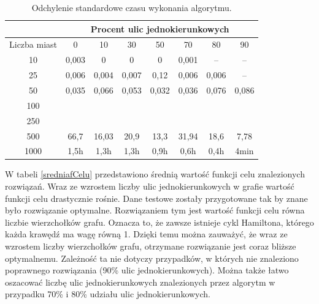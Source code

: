 \documentclass[11pt,a4paper,twoside]{article}
\begin{document}
\bgroup
\def\arraystretch{1.2}
\begin{table}[ht]
\centering
\begin{tabular}{|c|c|c|c|c|c|c|c|}
\hline
 & \multicolumn{7}{c|}{Procent ulic jednokierunkowych}\\\hline
Liczba miast & 0 & 10 & 30 & 50 & 70& 80& 90\\  \hline
10& 0,003& 0& 0& 0& 0,001& --& --\\ \hline
25& 0,006& 0,004& 0,007& 0,12& 0,006& 0,006& --\\ \hline
50& 0,035& 0,066& 0,053& 0,032& 0,036& 0,076& 0,086\\ \hline
100& & & & & & & \\ \hline
250& & & & & & & \\ \hline
500& 66,7& 16,03& 20,9& 13,3& 31,94& 18,6& 7,78\\ \hline
1000& 1,5h& 1,3h& 1,3h& 0,9h& 0,6h& 0,4h& 4min\\ \hline
\end{tabular}
\caption{Odchylenie standardowe czasu wykonania algorytmu.}
\label{odchylenieCzasuWykonania}
\end{table}
\egroup

W tabeli \ref{sredniafCelu} przedstawiono średnią wartość funkcji celu znalezionych rozwiązań. Wraz ze wzrostem liczby ulic jednokierunkowych w grafie wartość funkcji celu drastycznie rośnie. Dane testowe zostały przygotowane tak by znane było rozwiązanie optymalne. Rozwiązaniem tym jest wartość funkcji celu równa liczbie wierzchołków grafu. Oznacza to, że zawsze istnieje cykl Hamiltona, którego każda krawędź ma wagę równą 1. Dzięki temu można zauważyć, że wraz ze wzrostem liczby wierzchołków grafu, otrzymane rozwiązanie jest coraz bliższe optymalnemu. Zależność ta nie dotyczy przypadków, w których nie znaleziono poprawnego rozwiązania (90\% ulic jednokierunkowych). Można także łatwo oszacować liczbę ulic jednokierunkowych znalezionych przez algorytm w przypadku 70\% i 80\% udziału ulic jednokierunkowych.
\end{document}
